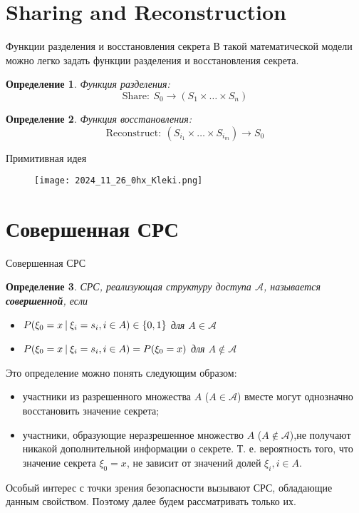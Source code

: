 \documentclass{beamer}
\newtheorem{define}{Определение}
\begin{document}
\section{Sharing and Reconstruction}
\begin{frame}{Функции разделения и восстановления секрета}
    В такой математической модели можно легко задать функции разделения и восстановления секрета.
    \begin{define}
        Функция разделения:
        \[
        \text{Share}: \ S_0 \to (S_1 \times \dots \times S_n)
        \]
    \end{define}
    \begin{define}
        Функция восстановления:
        \[
        \text{Reconstruct}: \ (S_{i_1} \times \dots \times S_{i_m}) \to S_0
        \]
    \end{define}
\end{frame}

\begin{frame}{Примитивная идея}
    \begin{figure}
    \centering
    \texttt{[image: 2024\_11\_26\_0hx\_Kleki.png]}
\end{figure}
\end{frame}

\section{Совершенная СРС}
\begin{frame}{Совершенная СРС}
    \begin{define}
        СРС, реализующая структуру доступа \(\mathcal{A}\), называется \textbf{совершенной}, если
        \begin{itemize}
            \item \(P(\xi_0 = x \ \vline \ \xi_i = s_i, i \in A) \in \{ 0, 1 \}\) \quad для \(A \in \mathcal{A}\)
            \item \(P(\xi_0 = x \ \vline \ \xi_i = s_i, i \in A) = P(\xi_0 = x)\) \quad для \(A \not\in \mathcal{A}\)
        \end{itemize}
    \end{define}
    Это определение можно понять следующим образом:
    \begin{itemize}
        \item участники из разрешенного множества \(A\) (\(A \in \mathcal{A}\)) вместе могут однозначно восстановить значение секрета;
        \item участники, образующие неразрешенное множество \(A\) (\(A \not\in \mathcal{A}\)),не получают никакой дополнительной информации о секрете. Т. е. вероятность того, что значение секрета \(\xi_0 = x\), не зависит от значений долей \(\xi_i, i \in A\). 
    \end{itemize}
    Особый интерес с точки зрения безопасности вызывают СРС, обладающие данным свойством. Поэтому далее будем рассматривать только их.
\end{frame}
\end{document}
